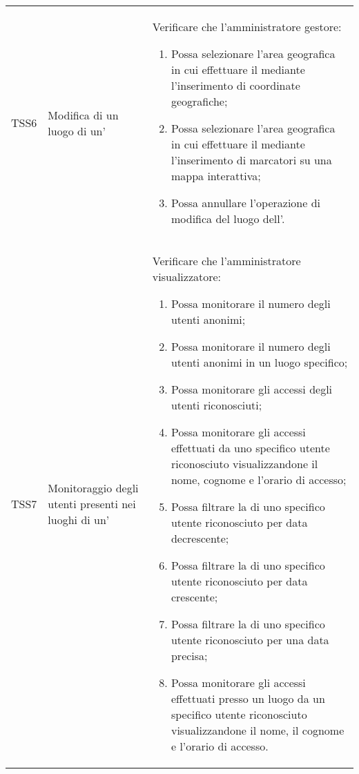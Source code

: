 {\begin{longtable}{ c  C{3cm}  C{11cm} }
TSS6 & Modifica di un luogo di un' & 
Verificare che l'amministratore gestore:
\begin{enumerate}
    \item Possa selezionare l'area geografica in cui effettuare il  mediante l'inserimento di coordinate geografiche;
    \item Possa selezionare l'area geografica in cui effettuare il  mediante l'inserimento di marcatori su una mappa interattiva;
    \item Possa annullare l'operazione di modifica del luogo dell'.
\end{enumerate} \\

TSS7 & Monitoraggio degli utenti presenti nei luoghi di un' &
Verificare che l'amministratore visualizzatore:
\begin{enumerate}
    \item Possa monitorare il numero degli utenti anonimi;
    \item Possa monitorare il numero degli utenti anonimi in un luogo specifico;
    \item Possa monitorare gli accessi degli utenti riconosciuti;
    \item Possa monitorare gli accessi effettuati da uno specifico utente riconosciuto visualizzandone il nome, cognome e l'orario di accesso;
    \item Possa filtrare la  di uno specifico utente riconosciuto per data decrescente;
    \item Possa filtrare la  di uno specifico utente riconosciuto per data crescente;
    \item Possa filtrare la  di uno specifico utente riconosciuto per una data precisa;
    \item Possa monitorare gli accessi effettuati presso un luogo da un specifico utente riconosciuto visualizzandone il nome, il cognome e l’orario di accesso.
\end{enumerate} \\


\end{longtable}}
